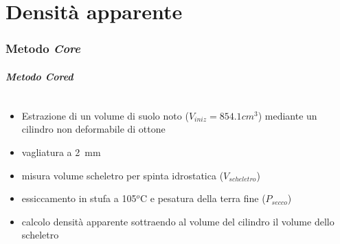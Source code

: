 \part{Densit\`a apparente}
\section{Metodo \emph{Core}}
\begin{frame}
  \frametitle{Metodo \emph{Cored}} %
  \begin{columns}
    \begin{block}{}
      \pause
      \begin{itemize}[<+->] 
      \item Estrazione di un volume di suolo noto
        ($V_{iniz}=854.1 cm^3$) mediante un cilindro non deformabile
        di ottone
      \item vagliatura a \SI{2}{\milli\meter}
      \item misura volume scheletro per spinta idrostatica
        ($V_{scheletro}$)
      \item essiccamento in stufa a 105$^o$C e pesatura della terra
        fine ($P_{secco}$)
      \item calcolo densit\`a apparente sottraendo al volume del
        cilindro il volume dello scheletro
      \end{itemize}
    \end{block}
\end{columns}
\end{frame}

